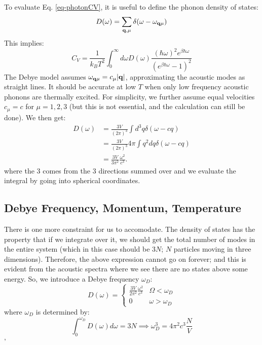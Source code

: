 To evaluate Eq. \eqref{eq-photonCV}, it is useful to define the phonon density of states:
\begin{equation}
    D(\omega) = \sum_{\mathbf{q}, \mu} \delta(\omega - \omega_{\mathbf{q}\mu})
\end{equation}
This implies:
\begin{equation}
    C_V = \frac{1}{k_BT^2}\int_0^\infty d\omega D(\omega)\frac{(\hbar\omega)^2 e^{\beta\hbar\omega}}{(e^{\beta\hbar\omega} - 1)^2}
\end{equation}
The Debye model assumes $\omega_{\mathbf{q}\mu} = c_\mu\lvert \mathbf{q} \rvert$, approximating the acoustic modes as straight lines. It should be accurate at low $T$ when only low frequency acoustic phonons are thermally excited. For simplicity, we further assume equal velocities $c_\mu = c$ for $\mu = 1,2,3$ (but this is not essential, and the calculation can still be done). We then get:
\begin{equation}
    \begin{split}
        D(\omega) &= \frac{3V}{(2\pi)^3}\int d^3q \delta(\omega - cq)
        \\ &= \frac{3V}{(2\pi)^3}4\pi \int q^2 dq \delta(\omega - cq) 
        \\ &= \frac{3V}{3\pi^2}\frac{\omega^2}{c^3}.
    \end{split}
\end{equation}
where the $3$ comes from the 3 directions summed over and we evaluate the integral by going into spherical coordinates. 

\subsection{Debye Frequency, Momentum, Temperature}
There is one more constraint for us to accomodate. The density of states has the property that if we integrate over it, we should get the total number of modes in the entire system (which in this case should be $3N$; $N$ particles moving in three dimensions). Therefore, the above expression cannot go on forever; and this is evident from the acoustic spectra where we see there are no states above some energy. So, we introduce a Debye frequency $\omega_D$:
\begin{equation}
    D(\omega) = \begin{cases}
        \frac{3V}{2\pi^2}\frac{\omega^2}{c^3} & \Omega < \omega_D
        \\ 0 & \omega > \omega_D
    \end{cases}
\end{equation}
where $\omega_D$ is determined by:
\begin{equation}
    \int_0^{\omega_D}D(\omega)d\omega = 3N \implies \omega_D^3 = 4\pi^2c^3\frac{N}{V}
\end{equation}'


